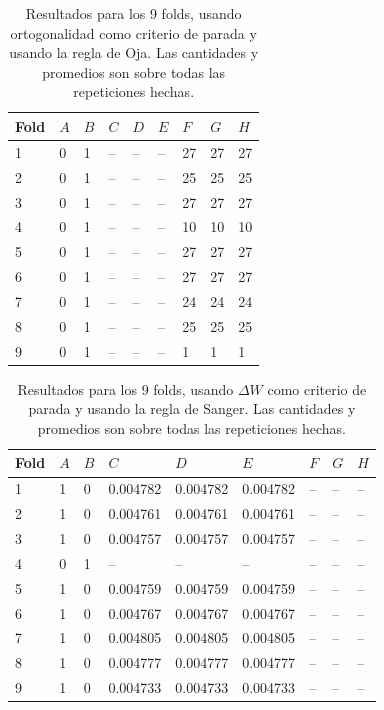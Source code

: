 \documentclass[informe.tex]{subfiles}
\begin{document}
	
	\begin{table}[H]
	  \centering
	  \begin{tabular}{|l|l|l|l|l|l|l|l|l|} \hline
	  Fold & $A$ & $B$ & $C$ & $D$ & $E$ & $F$ & $G$ & $H$ \\ \hline
	  1& 0 & 1 & -- & -- & -- & 27 & 27 & 27 \\ \hline
	  2& 0 & 1 & -- & -- & -- & 25 & 25 & 25 \\ \hline
	  3& 0 & 1 & -- & -- & -- & 27 & 27 & 27 \\ \hline
	  4& 0 & 1 & -- & -- & -- & 10 & 10 & 10 \\ \hline
	  5& 0 & 1 & -- & -- & -- & 27 & 27 & 27 \\ \hline
	  6& 0 & 1 & -- & -- & -- & 27 & 27 & 27 \\ \hline
	  7& 0 & 1 & -- & -- & -- & 24 & 24 & 24 \\ \hline
	  8& 0 & 1 & -- & -- & -- & 25 & 25 & 25 \\ \hline
	  9& 0 & 1 & -- & -- & -- & 1 & 1 & 1 \\ \hline
	  \end{tabular}
	  \caption{Resultados para los 9 folds, usando ortogonalidad como criterio de parada y usando la regla de Oja. Las cantidades y promedios son sobre todas las repeticiones hechas.}
	  \label{tab:ortogonalidad_oja}
	\end{table}

	
	\begin{table}[H]
	  \centering
	  \begin{tabular}{|l|l|l|l|l|l|l|l|l|} \hline
	  Fold & $A$ & $B$ & $C$ & $D$ & $E$ & $F$ & $G$ & $H$ \\ \hline
	  1& 1 & 0 & 0.004782 & 0.004782 & 0.004782 & -- & -- & -- \\ \hline
	  2& 1 & 0 & 0.004761 & 0.004761 & 0.004761 & -- & -- & -- \\ \hline
	  3& 1 & 0 & 0.004757 & 0.004757 & 0.004757 & -- & -- & -- \\ \hline
	  4& 0 & 1 & -- & -- & -- & -- & -- & -- \\ \hline
	  5& 1 & 0 & 0.004759 & 0.004759 & 0.004759 & -- & -- & -- \\ \hline
	  6& 1 & 0 & 0.004767 & 0.004767 & 0.004767 & -- & -- & -- \\ \hline
	  7& 1 & 0 & 0.004805 & 0.004805 & 0.004805 & -- & -- & -- \\ \hline
	  8& 1 & 0 & 0.004777 & 0.004777 & 0.004777 & -- & -- & -- \\ \hline
	  9& 1 & 0 & 0.004733 & 0.004733 & 0.004733 & -- & -- & -- \\ \hline
	  \end{tabular}
	  \caption{Resultados para los 9 folds, usando $\Delta W$ como criterio de parada y usando la regla de Sanger. Las cantidades y promedios son sobre todas las repeticiones hechas.}
	  \label{tab:pesos_sanger}
	\end{table}      
	
\end{document}
